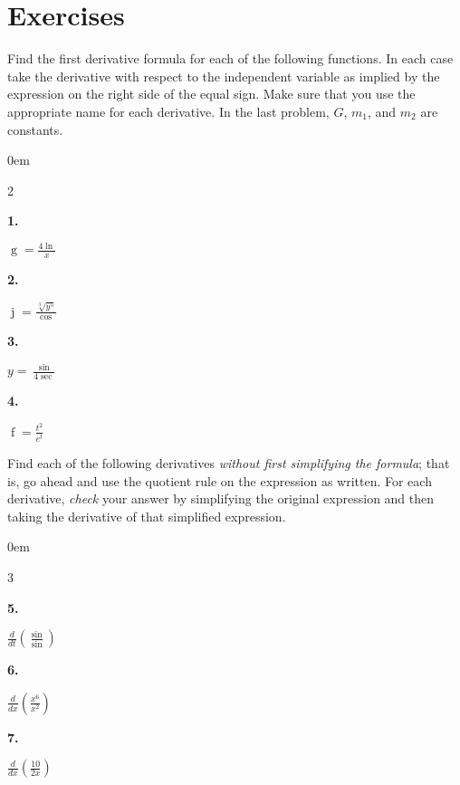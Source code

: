 \documentclass[12pt,]{book}
\theoremstyle{plain}
\theoremstyle{definition}
\numberwithin{equation}{section}
\newenvironment{exercisegroup}%
{\medskip\noindent}%
{\par\bigskip}%
\newlength{\exercisegroupindent}%
\newlength{\exercisegroupitemwidth}%
\newenvironment{exercisegrouplist}%
{\vspace{-\partopsep}%
\begin{adjustwidth}{\exercisegroupindent}{0em}}%
{\end{adjustwidth}%
\vspace{-\partopsep}%
\vspace{\baselineskip}}%
\newenvironment{exercisegroupbycol}[1]%
{\begin{exercisegrouplist}%
\vspace{-\multicolsep}%
\begin{multicols}{#1}%
\setlength{\parindent}{0em}%
\setlength{\exercisegroupitemwidth}{\linewidth}}%
{\end{multicols}%
\vspace{-\multicolsep}%
\end{exercisegrouplist}}%
\newenvironment{exercisegroupitem}[1]%
{\begin{minipage}[t]{\exercisegroupitemwidth}
\vspace{0pt}%
{\bfseries#1}%
\rule{0pt}{\baselineskip}}{\strut%
\end{minipage}%
\hspace{\columnsep}}%
\providecommand\phantomsection{}
\newcommand{\fe}[2]{\mathop{{#1}{\left(#2\right)}}}
\newcommand{\lzoo}[2]{{\frac{d}{d#1}}{\left(#2\right)}}
\begin{document}
\section*{Exercises}\label{exercises-34}

\begin{exercisegroup}%
Find the first derivative formula for each of the following functions.  In each case take the derivative with respect to the independent variable as implied by the expression on the right side of the equal sign.  Make sure that you use the appropriate name for each derivative. In the last problem, \(G\), \(m_1\), and \(m_2\) are constants.%
\begin{exercisegroupbycol}{2}%
\begin{exercisegroupitem}{1. }\phantomsection\hypertarget{exercise-255}{\null}
\(\fe{g}{x}=\frac{4\fe{\ln}{x}}{x}\)%
\end{exercisegroupitem}%
\par%
\begin{exercisegroupitem}{2. }\phantomsection\hypertarget{exercise-256}{\null}
\(\fe{j}{y}=\frac{\sqrt[3]{y^5}}{\fe{\cos}{y}}\)%
\end{exercisegroupitem}%
\par%
\begin{exercisegroupitem}{3. }\phantomsection\hypertarget{exercise-257}{\null}
\(y=\frac{\fe{\sin}{x}}{4\fe{\sec}{x}}\)%
\end{exercisegroupitem}%
\par%
\begin{exercisegroupitem}{4. }\phantomsection\hypertarget{exercise-258}{\null}
\(\fe{f}{t}=\frac{t^2}{e^t}\)%
\end{exercisegroupitem}%
\par%
\end{exercisegroupbycol}%
\end{exercisegroup}%
\begin{exercisegroup}%
Find each of the following derivatives \emph{without first simplifying the formula}; that is, go ahead and use the quotient rule on the expression as written. For each derivative, \emph{check} your answer by simplifying the original expression and then taking the derivative of that simplified expression.%
\begin{exercisegroupbycol}{3}%
\begin{exercisegroupitem}{5. }\phantomsection\hypertarget{unsimplified-quotient-first}{\null}
\(\lzoo{t}{\frac{\fe{\sin}{t}}{\fe{\sin}{t}}}\)%
\end{exercisegroupitem}%
\par%
\begin{exercisegroupitem}{6. }\phantomsection\hypertarget{exercise-260}{\null}
\(\lzoo{x}{\frac{x^6}{x^2}}\)%
\end{exercisegroupitem}%
\par%
\begin{exercisegroupitem}{7. }\phantomsection\hypertarget{unsimplified-quotient-last}{\null}
\(\lzoo{x}{\frac{10}{2x}}\)%
\end{exercisegroupitem}%
\par%
\end{exercisegroupbycol}%
\end{exercisegroup}%
\end{document}
